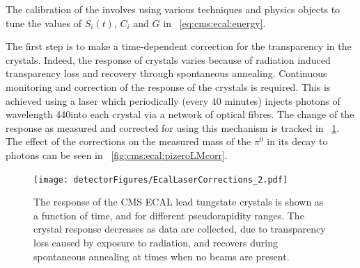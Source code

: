 The calibration of the \ECAL involves using various techniques and physics objects to tune the values of $S_{i}(t)$, $C_{i}$ and $G$ in \Eq~\ref{eq:cms:ecal:energy}. 

The first step is to make a time-dependent correction for the transparency in the crystals. Indeed, the response of \ECAL crystals varies because of radiation induced transparency loss and recovery through spontaneous annealing. Continuous monitoring and correction of the response of the crystals is required. This is achieved using a laser which periodically (every 40 minutes) injects photons of wavelength 440\nm into each crystal via a network of optical fibres. The change of the response as measured and corrected for using this mechanism is tracked in \Fig~\ref{fig:cms:ecal:lasercorrections}. The effect of the corrections on the measured mass of the $\pi^0$ in its decay to photons can be seen in \Fig~\ref{fig:cms:ecal:pizeroLMcorr}.


\begin{figure}[h]
\centering
\texttt{[image: detectorFigures/EcalLaserCorrections\_2.pdf]}
\caption{The response of the CMS ECAL lead tungstate crystals is shown as a function of time, and for different pseudorapidity ranges. The crystal response decreases as data are collected, due to transparency loss caused by exposure to radiation, and recovers during spontaneous annealing at times when no beams are present\quad\cite{CMSECALPublic}.}
\label{fig:cms:ecal:lasercorrections}
\end{figure}


